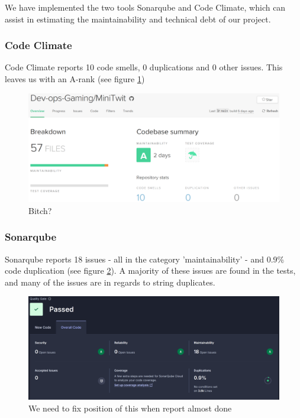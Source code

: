 We have implemented the two tools Sonarqube and Code Climate, which can assist in estimating the maintainability and technical debt of our project.
\subsubsection{Code Climate}
Code Climate reports 10 code smells, 0 duplications and 0 other issues. This leaves us with an A-rank (see figure \ref{fig:CodeClimate})\\
\begin{figure}[h]
\centering
\includegraphics[width=\textwidth]{images/code_climate.png}
\caption{Bitch?}
\label{fig:CodeClimate}
\end{figure}

\subsubsection{Sonarqube}
Sonarqube reports 18 issues - all in the category 'maintainability' - and 0.9\% code duplication (see figure \ref{fig:SonarQube}). A majority of these issues are found in the tests, and many of the issues are in regards to string duplicates.
\begin{figure}[h]
\centering
\includegraphics[width=\textwidth]{images/sonarQube.png}
\caption{We need to fix position of this when report almost done}
\label{fig:SonarQube}
\end{figure}